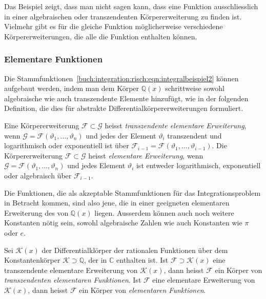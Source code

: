 Das Beispiel zeigt, dass man nicht sagen kann, dass eine Funktion
ausschliesslich in einer algebraischen oder transzendenten Körpererweiterung
zu finden ist. 
Vielmehr gibt es für die gleiche Funktion möglicherweise verschiedene
Körpererweiterungen, die alle die Funktion enthalten können.

%
%
\subsubsection{Elementare Funktionen}
Die Stammfunktionen~\eqref{buch:integration:risch:eqn:integralbeispiel2}
können aufgebaut werden, indem man dem Körper $\mathbb{Q}(x)$ schrittweise
sowohl algebraische wie auch transzendente Elemente hinzufügt,
wie in der folgenden Definition, die dies für abstrakte
Differentialkörpererweiterungen formuliert.

\begin{definition}
Eine Körpererweiterung $\mathscr{F}\subset\mathscr{G}$ heisst 
{\em transzendente elementare Erweiterung}, wenn 
%
$\mathscr{G} = \mathscr{F}(\vartheta_1,\dots,\vartheta_n)$ und
jedes der Element $\vartheta_i$ transzendent und logarithmisch oder
exponentiell ist über
$\mathscr{F}_{i-1}=\mathscr{F}(\vartheta_1,\dots,\vartheta_{i-1})$.
Die Körpererweiterung $\mathscr{F}\subset\mathscr{G}$ heisst
{\em elementare Erweiterung}, wenn 
%
$\mathscr{G} = \mathscr{F}(\vartheta_1,\dots,\vartheta_n)$ und
jedes Element $\vartheta_i$ ist entweder logarithmisch, exponentiell
oder algebraisch über $\mathscr{F}_{i-1}$.
\end{definition}

Die Funktionen, die als akzeptable Stammfunktionen für das Integrationsproblem
in Betracht kommen, sind also jene, die in einer geeigneten elementaren
Erweiterung des von $\mathbb{Q}(x)$ liegen.
Ausserdem können auch noch weitere Konstanten nötig sein, sowohl
algebraische Zahlen wie auch Konstanten wie $\pi$ oder $e$.

\begin{definition}
Sei $\mathscr{K}(x)$ der Differentialklörper der rationalen Funktionen
über dem Konstantenkörper $\mathscr{K}\supset\mathbb{Q}$, der in $\mathbb{C}$
enthalten ist.
Ist $\mathscr{F}\supset \mathscr{K}(x)$ eine transzendente elementare 
Erweiterung von $\mathscr{K}(x)$, dann heisst $\mathscr{F}$
ein Körper von {\em transzendenten elementaren Funktionen}.
Ist $\mathscr{F}$ eine elementare Erweiterung von $\mathscr{K}(x)$, dann
heisst $\mathscr{F}$ ein Körper von {\em elementaren Funktionen}.
\end{definition}

